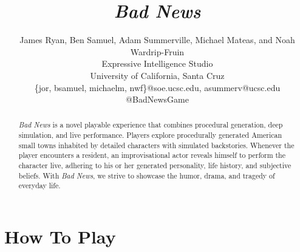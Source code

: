 \documentclass[letterpaper]{article}
\begin{document}

\title{\textit{Bad News}}

\author{James Ryan, Ben Samuel, Adam Summerville, Michael Mateas, and Noah Wardrip-Fruin \\
Expressive Intelligence Studio \\
University of California, Santa Cruz \\
\{jor, bsamuel, michaelm, nwf\}@soe.ucsc.edu, asummerv@ucsc.edu \\
@BadNewsGame
}



\maketitle
\begin{abstract}
\textit{Bad News} is a novel playable experience that combines procedural generation, deep simulation, and live performance. Players explore procedurally generated American small towns inhabited by detailed characters with simulated backstories. Whenever the player encounters a resident, an improvisational actor reveals himself to perform the character live, adhering to his or her generated personality, life history, and subjective beliefs. With \textit{Bad News}, we strive to showcase the humor, drama, and tragedy of everyday life.
\end{abstract}


\section{How To Play}
\end{document}
